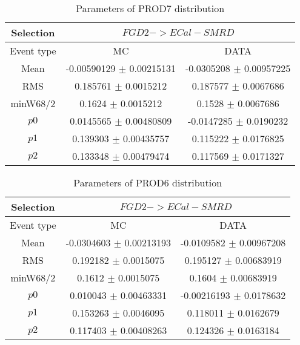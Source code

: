 \documentclass[a4paper,12pt]{article}
\begin{document}
\begin{table}[htbp]
\begin{center}
\begin{tabular}{|c|c|c|}
        \hline
        Selection & \multicolumn{2}{|c|}{$FGD2->ECal-SMRD$}  \\ \hline
        Event type & MC & DATA \\ 
        \hline
        Mean & -0.00590129 $\pm$ 0.00215131 & -0.0305208 $\pm$ 0.00957225 \\ 
        \hline 
        RMS & 0.185761 $\pm$ 0.0015212 & 0.187577 $\pm$ 0.0067686 \\ 
        \hline 
        minW68/2 & 0.1624 $\pm$ 0.0015212 & 0.1528 $\pm$ 0.0067686 \\ 
        \hline 
        $p0$ & 0.0145565 $\pm$ 0.00480809 & -0.0147285 $\pm$ 0.0190232 \\ 
        \hline 
        $p1$ & 0.139303 $\pm$ 0.00435757 & 0.115222 $\pm$ 0.0176825 \\ 
        \hline 
        $p2$ & 0.133348 $\pm$ 0.00479474 & 0.117569 $\pm$ 0.0171327 \\ 
        \hline 
\end{tabular}
\caption{Parameters of PROD7 distribution } \vspace{0.2in}
\label{xxx}
\end{center}
\end{table}
\begin{table}[htbp]
\begin{center}
\begin{tabular}{|c|c|c|}
        \hline
        Selection & \multicolumn{2}{|c|}{$FGD2->ECal-SMRD$}  \\ \hline
        Event type & MC & DATA \\ 
        \hline
        Mean & -0.0304603 $\pm$ 0.00213193 & -0.0109582 $\pm$ 0.00967208 \\ 
        \hline 
        RMS & 0.192182 $\pm$ 0.0015075 & 0.195127 $\pm$ 0.00683919 \\ 
        \hline 
        minW68/2 & 0.1612 $\pm$ 0.0015075 & 0.1604 $\pm$ 0.00683919 \\ 
        \hline 
        $p0$ & 0.010043 $\pm$ 0.00463331 & -0.00216193 $\pm$ 0.0178632 \\ 
        \hline 
        $p1$ & 0.153263 $\pm$ 0.0046095 & 0.118011 $\pm$ 0.0162679 \\ 
        \hline 
        $p2$ & 0.117403 $\pm$ 0.00408263 & 0.124326 $\pm$ 0.0163184 \\ 
        \hline 
\end{tabular}
\caption{Parameters of PROD6 distribution } \vspace{0.2in}
\label{xxx}
\end{center}
\end{table}
\end{document}
